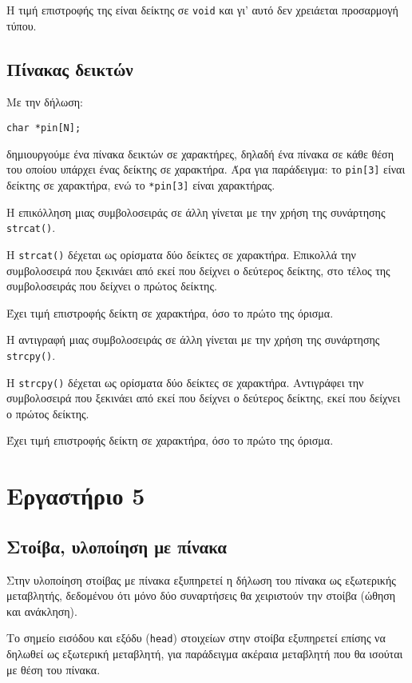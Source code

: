 \documentclass[14pt, fleqn, leqno]{extreport}
\begin{document}
Η τιμή επιστροφής της είναι δείκτης σε \lstinline{void} και γι' αυτό δεν χρειάεται προσαρμογή τύπου.

\section{Πίνακας δεικτών}

Με την δήλωση:
\begin{center}
    \lstinline{char *pin[N];}
\end{center}
δημιουργούμε ένα πίνακα δεικτών σε χαρακτήρες, δηλαδή ένα πίνακα σε κάθε θέση του οποίου υπάρχει ένας δείκτης σε χαρακτήρα. Άρα για παράδειγμα: το \lstinline{pin[3]} είναι δείκτης σε χαρακτήρα, ενώ το \lstinline{*pin[3]} είναι χαρακτήρας.

Η επικόλληση μιας συμβολοσειράς σε άλλη γίνεται με την χρήση της συνάρτησης \lstinline{strcat()}.

Η \lstinline{strcat()} δέχεται ως ορίσματα δύο δείκτες σε χαρακτήρα. Επικολλά την συμβολοσειρά που ξεκινάει από εκεί που δείχνει ο δεύτερος δείκτης, στο τέλος της συμβολοσειράς που δείχνει ο πρώτος δείκτης.

Έχει τιμή επιστροφής δείκτη σε χαρακτήρα, όσο το πρώτο της όρισμα.

Η αντιγραφή μιας συμβολοσειράς σε άλλη γίνεται με την χρήση της συνάρτησης \lstinline{strcpy()}.

H \lstinline{strcpy()} δέχεται ως ορίσματα δύο δείκτες σε χαρακτήρα. Αντιγράφει την συμβολοσειρά που ξεκινάει από εκεί που δείχνει ο δεύτερος δείκτης, εκεί που δείχνει ο πρώτος δείκτης.

Έχει τιμή επιστροφής δείκτη σε χαρακτήρα, όσο το πρώτο της όρισμα.


\chapter{Εργαστήριο 5}

\section{Στοίβα, υλοποίηση με πίνακα}

Στην υλοποίηση στοίβας με πίνακα εξυπηρετεί η δήλωση του πίνακα ως εξωτερικής μεταβλητής, δεδομένου ότι μόνο δύο συναρτήσεις θα χειριστούν την στοίβα (ώθηση και ανάκληση).

Το σημείο εισόδου και εξόδυ (\lstinline{head}) στοιχείων στην στοίβα εξυπηρετεί επίσης να δηλωθεί ως εξωτερική μεταβλητή, για παράδειγμα ακέραια μεταβλητή που θα ισούται με θέση του πίνακα.
\end{document}
